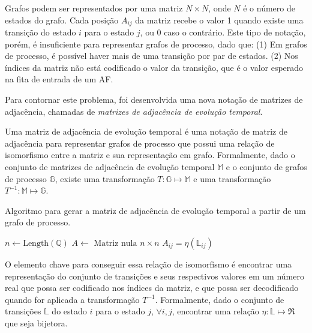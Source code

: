 \documentclass[a4,11pt]{article}
\begin{document}
Grafos podem ser representados por uma matriz $N \times N$, onde $N$
é o número de estados do grafo. Cada posição $A_{ij}$ da matriz recebe o valor
1 quando existe uma transição do estado $i$ para o estado $j$, ou 0 caso o
contrário. Este tipo de notação, porém, é insuficiente para representar grafos
de processo, dado que: (1) Em grafos de processo, é possível haver mais de
uma transição por par de estados. (2) Nos índices da matriz não está
codificado o valor da transição, que é o valor esperado na fita de
entrada de um AF.

Para contornar este problema, foi desenvolvida uma nova notação de matrizes de adjacência,
chamadas de \textit{matrizes de adjacência de evolução temporal}.

Uma matriz de adjacência de evolução temporal é uma notação de matriz de
adjacência para representar grafos de processo que possui uma relação
de isomorfismo entre a matriz e sua representação em grafo.
Formalmente, dado o conjunto de matrizes de adjacência
de evolução temporal $\mathbb{M}$ e o conjunto de grafos de processo $\mathbb{G}$,
existe uma transformação $T: \mathbb{G} \mapsto \mathbb{M}$ e uma
transformação $T^{-1}: \mathbb{M} \mapsto \mathbb{G}$.

\begin{algorithm}
\caption{Algoritmo para gerar a matriz de adjacência de evolução temporal a partir
de um grafo de processo.}
\label{alg:stom}
\begin{algorithmic}
\STATE $n \leftarrow \mbox{Length}(\mathbb{Q})$ 
\STATE $A \leftarrow \mbox{ Matriz nula } n \times n$
\STATE $A_{ij} = \eta(\mathbb{\mathbb{L}}_{ij})$
\ENDIF
\ENDFOR
\end{algorithmic}
\end{algorithm}

O elemento chave para conseguir essa relação de isomorfismo
é encontrar uma representação do conjunto de transições e
seus respectivos valores em um número real que possa ser codificado
nos índices da matriz, e que possa ser decodificado quando for
aplicada a transformação $T^{-1}$. Formalmente, dado o conjunto de transições
$\mathbb{L}$ do estado $i$ para o estado $j$, $\forall i,j$, encontrar uma
relação $\eta:\mathbb{L} \mapsto \Re$ que seja bijetora.
\end{document}
